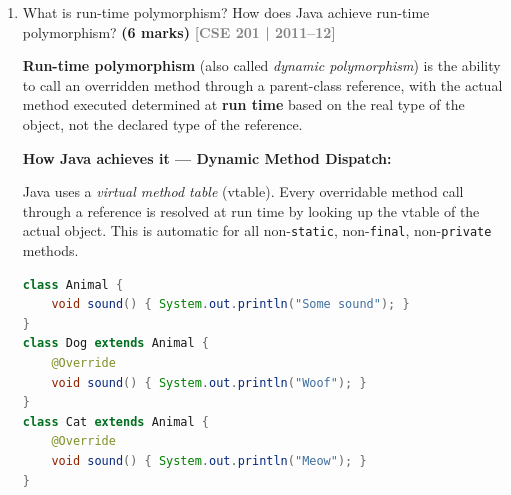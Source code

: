 \documentclass[12pt,a3paper]{article}
\newcommand{\yr}[1]{\hfill\textcolor{gray}{\small\textbf{[#1]}}}
\newcommand{\mk}[1]{\textcolor{orange!70!black}{\small\textbf{(#1 marks)}}}
\begin{document}
\begin{enumerate}
\begin{tcolorbox}
In C/C++, \texttt{main(int argc, char* argv[])} requires a separate
\texttt{argc} because a raw array carries no length information.

In Java, \texttt{main(String[] args)} receives a \textbf{String array
object}, which already knows its own length via \texttt{args.length}.
Therefore a separate count parameter is unnecessary.

\begin{lstlisting}[language=Java]
public class Demo {
    public static void main(String[] args) {
        System.out.println("Argument count: " + args.length);
        for (int i = 0; i < args.length; i++)
            System.out.println("args[" + i + "] = " + args[i]);
    }
}
// Run: java Demo Hello World
// Output:
//   Argument count: 2
//   args[0] = Hello
//   args[1] = World
\end{lstlisting}

The JVM populates \texttt{args} automatically with the command-line
tokens; \texttt{args.length} replaces the role of \texttt{argc}.
\end{tcolorbox}

\item What is run-time polymorphism? How does Java achieve run-time polymorphism? \mk{6}
\yr{CSE 201 | 2011--12}

\begin{tcolorbox}[enhanced,breakable,ansbox,
  colback=cC!4,colframe=cC,boxrule=0.8pt,arc=5pt,
  title={\textbf{Answer --- Run-Time Polymorphism in Java}},
  fonttitle=\bfseries\color{white},colbacktitle=cC]

\textbf{Run-time polymorphism} (also called \emph{dynamic polymorphism})
is the ability to call an overridden method through a parent-class
reference, with the actual method executed determined at \textbf{run
time} based on the real type of the object, not the declared type of
the reference.

\textbf{How Java achieves it --- Dynamic Method Dispatch:}

Java uses a \emph{virtual method table} (vtable). Every overridable
method call through a reference is resolved at run time by looking up
the vtable of the actual object. This is automatic for all
non-\texttt{static}, non-\texttt{final}, non-\texttt{private} methods.

\begin{lstlisting}[language=Java]
class Animal {
    void sound() { System.out.println("Some sound"); }
}
class Dog extends Animal {
    @Override
    void sound() { System.out.println("Woof"); }
}
class Cat extends Animal {
    @Override
    void sound() { System.out.println("Meow"); }
}


\end{lstlisting}
\end{tcolorbox}
\end{enumerate}
\end{document}
